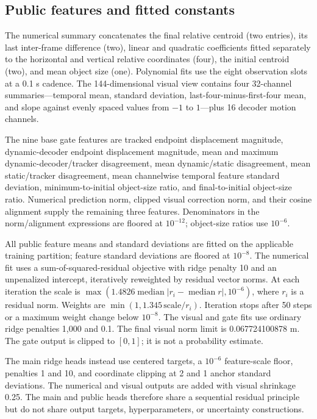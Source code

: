 \documentclass[11pt]{article}
\begin{document}
\subsection{Public features and fitted constants}
The numerical summary concatenates the final relative centroid (two entries), its last inter-frame difference (two), linear and quadratic coefficients fitted separately to the horizontal and vertical relative coordinates (four), the initial centroid (two), and mean object size (one). Polynomial fits use the eight observation slots at a 0.1 s cadence. The 144-dimensional visual view contains four 32-channel summaries---temporal mean, standard deviation, last-four-minus-first-four mean, and slope against evenly spaced values from $-1$ to $1$---plus 16 decoder motion channels.

The nine base gate features are tracked endpoint displacement magnitude, dynamic-decoder endpoint displacement magnitude, mean and maximum dynamic-decoder/tracker disagreement, mean dynamic/static disagreement, mean static/tracker disagreement, mean channelwise temporal feature standard deviation, minimum-to-initial object-size ratio, and final-to-initial object-size ratio. Numerical prediction norm, clipped visual correction norm, and their cosine alignment supply the remaining three features. Denominators in the norm/alignment expressions are floored at $10^{-12}$; object-size ratios use $10^{-6}$.

All public feature means and standard deviations are fitted on the applicable training partition; feature standard deviations are floored at $10^{-8}$. The numerical fit uses a sum-of-squared-residual objective with ridge penalty 10 and an unpenalized intercept, iteratively reweighted by residual vector norms. At each iteration the scale is $\max(1.4826\operatorname{median}|r_i-\operatorname{median}r|,10^{-6})$, where $r_i$ is a residual norm. Weights are $\min(1,1.345\,\mathrm{scale}/r_i)$. Iteration stops after 50 steps or a maximum weight change below $10^{-8}$. The visual and gate fits use ordinary ridge penalties 1,000 and 0.1. The final visual norm limit is 0.067724100878 m. The gate output is clipped to $[0,1]$; it is not a probability estimate.

The main ridge heads instead use centered targets, a $10^{-6}$ feature-scale floor, penalties 1 and 10, and coordinate clipping at 2 and 1 anchor standard deviations. The numerical and visual outputs are added with visual shrinkage 0.25. The main and public heads therefore share a sequential residual principle but do not share output targets, hyperparameters, or uncertainty constructions.
\end{document}
